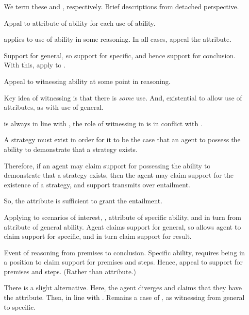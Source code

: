 \begin{note}[\WR{} and \AR{}]
  We term these \AR{} and \WR{}, respectively.
  Brief descriptions from detached perspective.

  \begin{proposition}[\AR{}]\label{A:s}
    Appal to attribute of ability for each use of ability.
  \end{proposition}

  \AR{} applies to use of ability in some reasoning.
  In all cases, appeal the attribute.

  Support for general, so support for specific, and hence support for conclusion.
  With this, apply to \aben{}.

  \begin{proposition}[\WR{}]
    Appeal to witnessing ability at some point in reasoning.
  \end{proposition}

  Key idea of witnessing is that there is \emph{some} use.
  And, existential to allow use of attributes, as with use of general.

  \AR{} is always in line with \uRa{}, the role of witnessing in \WR{} is in conflict with \uRa{}.
\end{note}

\begin{note}[\PA{} and \PW{}]
  \begin{proposition}[\PA{}]
    A strategy must exist in order for it to be the case that an agent to possess the ability to demonstrate that a strategy exists.

    Therefore, if an agent may claim support for possessing the ability to demonstrate that a strategy exists, then the agent may claim support for the existence of a strategy, and support transmits over entailment.

    So, the attribute is sufficient to grant the entailment.
  \end{proposition}

  Applying to scenarios of interest, \AR{}, attribute of specific ability, and in turn from attribute of general ability.
  Agent claims support for general, so allows agent to claim support for specific, and in turn claim support for result.

  \begin{proposition}[\PW{}]\label{W:s}
    Event of reasoning from premises to conclusion.
    Specific ability, requires being in a position to claim support for premises and steps.
    Hence, appeal to support for premises and steps.
    (Rather than attribute.)
  \end{proposition}

  There is a slight alternative.
  Here, the agent diverges and claims that they have the attribute.
  Then, in line with \PA{}.
  Remains a case of \WR{}, as witnessing from general to specific.
\end{note}

